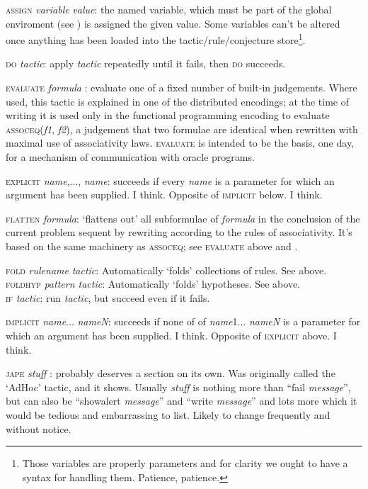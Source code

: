 \textsc{assign} \textit{variable} \textit{value}: the named variable, which must be part of the global enviroment (see ) is assigned the given value. Some variables can't be altered once anything has been loaded into the tactic/rule/conjecture store\footnote{Those variables are properly parameters and for clarity we ought to have a syntax for handling them. Patience, patience.}.


\textsc{do} \textit{tactic}: apply \textit{tactic} repeatedly until it fails, then \textsc{do} succeeds.


\textsc{evaluate} \textit{formula} : evaluate one of a fixed number of built-in judgements. Where used, this tactic is explained in one of the distributed encodings; at the time of writing it is used only in the functional programming encoding to evaluate \textsc{assoceq}(\textit{f1}, \textit{f2}), a judgement that two formulae are identical when rewritten with maximal use of associativity laws. \textsc{evaluate} is intended to be the basis, one day, for a mechanism of communication with oracle programs.


\textsc{explicit} \textit{name},..., \textit{name}: succeeds if every \textit{name} is a parameter for which an argument has been supplied. I think. Opposite of \textsc{implicit} below. I think.


\textsc{flatten} \textit{formula}: `flattens out' all subformulae of \textit{formula} in the conclusion of the current problem sequent by rewriting according to the rules of associativity. It's based on the same machinery as \textsc{assoceq}; see \textsc{evaluate} above and .


\textsc{fold} \textit{rulename} \textit{tactic}: Automatically `folds' collections of rules. See  above.\\
\textsc{foldhyp} \textit{pattern tactic}: Automatically `folds' hypotheses. See  above.\\
\textsc{if} \textit{tactic}: run \textit{tactic}, but succeed even if it fails.


\textsc{implicit} \textit{name}... \textit{nameN}: succeeds if none of of \textit{name}1... \textit{nameN} is a parameter for which an argument has been supplied. I think. Opposite of \textsc{explicit} above. I think.


\textsc{jape} \textit{stuff} : probably deserves a section on its own. Was originally called the `AdHoc' tactic, and it shows. Usually \textit{stuff} is nothing more than ``fail \textit{message}'', but can also be ``showalert \textit{message}'' and ``write \textit{message}'' and lots more which it would be tedious and embarrassing to list. Likely to change frequently and without notice.


